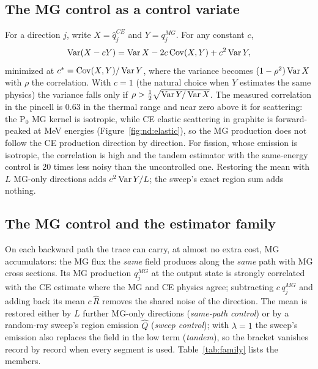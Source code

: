 \subsection{The MG control as a control variate}

For a direction $j$, write $X=\hat q^{CE}_j$ and $Y=q^{MG}_j$. For any constant $c$,
\begin{equation}
\operatorname{Var}(X-cY)=\operatorname{Var} X-2c\,\mathrm{Cov}(X,Y)+c^2\operatorname{Var} Y,
\end{equation}
minimized at $c^\ast=\mathrm{Cov}(X,Y)/\operatorname{Var} Y$, where the variance becomes $(1-\rho^2)\operatorname{Var} X$ with
$\rho$ the correlation. With $c=1$ (the natural choice when $Y$ estimates the same physics) the
variance falls only if $\rho>\frac12\sqrt{\operatorname{Var} Y/\operatorname{Var} X}$. The measured correlation in the pincell is
0.63 in the thermal range and near zero above it for scattering: the P$_0$ MG kernel is isotropic,
while CE elastic scattering in graphite is forward-peaked at MeV energies (Figure~\ref{fig:nd:elastic}),
so the MG production does not follow the CE production direction by direction. For fission, whose
emission is isotropic, the correlation is high and the tandem estimator with the same-energy control is
20 times less noisy than the uncontrolled one. Restoring the mean with $L$ MG-only directions adds
$c^2\operatorname{Var} Y/L$; the sweep's exact region sum adds nothing.

\subsection{The MG control and the estimator family}

On each backward path the trace can carry, at almost no extra cost, MG accumulators: the MG flux the
\emph{same} field produces along the \emph{same} path with MG cross sections. Its MG production
$q^{MG}_j$ at the output state is strongly correlated with the CE estimate where the MG and CE
physics agree; subtracting $c\,q^{MG}_j$ and adding back its mean $c\,\hat R$ removes the shared noise
of the direction. The mean is restored either by $L$ further MG-only directions (\emph{same-path
control}) or by a random-ray sweep's region emission $\hat Q$ (\emph{sweep control}); with
$\lambda=1$ the sweep's emission also replaces the field in the low term (\emph{tandem}), so the
bracket vanishes record by record when every segment is used. Table~\ref{tab:family} lists the
members.

